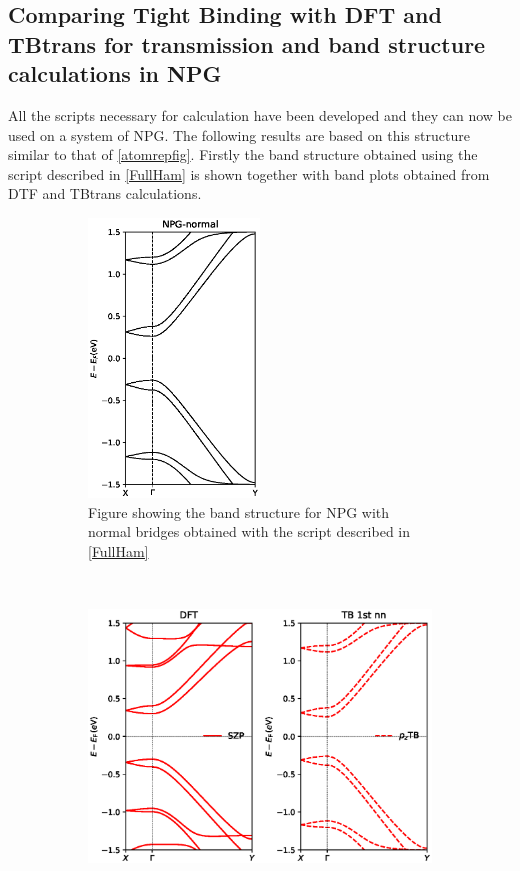 \subsection{Comparing Tight Binding with DFT and TBtrans for transmission and band structure calculations in NPG}\label{CompTB}
All the scripts necessary for calculation have been developed and they can now be used on a system of NPG.
The following results are based on this structure similar to that of \cref{atomrepfig}. Firstly the band structure obtained using the script described in \cref{FullHam} is shown together with  band plots obtained from DTF and TBtrans calculations. 
\begin{figure}[H]
	\centering
	\begin{subfigure}[t]{0.45\textwidth}
	\centering
		\includegraphics[width=0.5\textwidth]{Figures/NPG-normalBandstructures.eps}
		\caption{Figure showing the band structure for NPG with normal bridges obtained with the script described in \cref{FullHam}}
		\label{bsscript}
	\end{subfigure}
	~  %
	\begin{subfigure}[t]{0.45\textwidth}
	\centering
		\includegraphics[width=\textwidth]{Figures/bands.eps}

\end{subfigure}
\end{figure}
